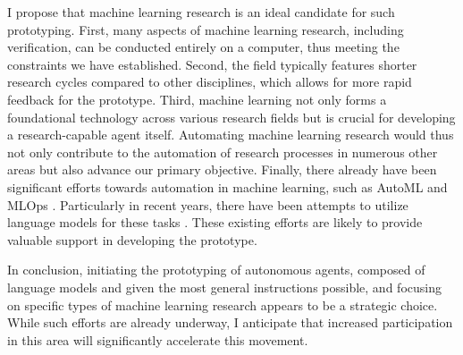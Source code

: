 I propose that machine learning research is an ideal candidate for such prototyping. First, many aspects of machine learning research, including verification, can be conducted entirely on a computer, thus meeting the constraints we have established. Second, the field typically features shorter research cycles compared to other disciplines, which allows for more rapid feedback for the prototype. Third, machine learning not only forms a foundational technology across various research fields but is crucial for developing a research-capable agent itself. Automating machine learning research would thus not only contribute to the automation of research processes in numerous other areas but also advance our primary objective. Finally, there already have been significant efforts towards automation in machine learning, such as AutoML \cite{hutter2019automated,bischl2023hyperparameter,lindauer2020best,white2023neural} and MLOps \cite{kreuzberger2023machine}. Particularly in recent years, there have been attempts to utilize language models for these tasks \cite{zheng2023can,zhang2023automl,vijay2023prompt}. These existing efforts are likely to provide valuable support in developing the prototype.

In conclusion, initiating the prototyping of autonomous agents, composed of language models and given the most general instructions possible, and focusing on specific types of machine learning research appears to be a strategic choice. While such efforts are already underway, I anticipate that increased participation in this area will significantly accelerate this movement.




